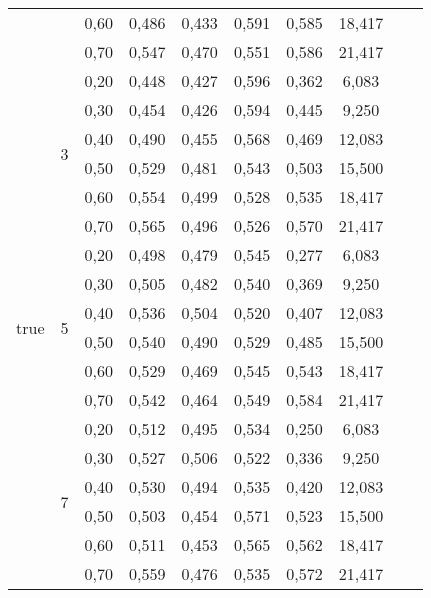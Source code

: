 \documentclass{article}
\begin{document}
\begin{longtable}[c]{|c|c|c|c|c|c|c|c|c|c|}
    &            & 0,60    &     0,486 &  0,433 & 0,591 & 0,585 & 18,417              \\ \cline{3-8}
    &            & 0,70    &     0,547 &  0,470 & 0,551 & 0,586 & 21,417              \\ \hline 
 \multirow{18}{*}{true} & \multirow{6}{*}{3} 
                 & 0,20    &     0,448 &  0,427 & 0,596 & 0,362 & 6,083               \\ \cline{3-8} 
    &            & 0,30    &     0,454 &  0,426 & 0,594 & 0,445 & 9,250               \\ \cline{3-8} 
    &            & 0,40    &     0,490 &  0,455 & 0,568 & 0,469 & 12,083              \\ \cline{3-8} 
    &            & 0,50    &     0,529 &  0,481 & 0,543 & 0,503 & 15,500              \\ \cline{3-8} 
    &            & 0,60    &     0,554 &  0,499 & 0,528 & 0,535 & 18,417              \\ \cline{3-8} 
    &            & 0,70    &     0,565 &  0,496 & 0,526 & 0,570 & 21,417              \\ \cline{2-8}
	   & \multirow{6}{*}{5} 
                 & 0,20    &     0,498 &  0,479 & 0,545 & 0,277 & 6,083               \\ \cline{3-8} 
    &            & 0,30    &     0,505 &  0,482 & 0,540 & 0,369 & 9,250               \\ \cline{3-8} 
    &            & 0,40    &     0,536 &  0,504 & 0,520 & 0,407 & 12,083              \\ \cline{3-8} 
    &            & 0,50    &     0,540 &  0,490 & 0,529 & 0,485 & 15,500              \\ \cline{3-8} 
    &            & 0,60    &     0,529 &  0,469 & 0,545 & 0,543 & 18,417              \\ \cline{3-8} 
    &            & 0,70    &     0,542 &  0,464 & 0,549 & 0,584 & 21,417              \\ \cline{2-8}
	   & \multirow{6}{*}{7} 
                 & 0,20    &     0,512 &  0,495 & 0,534 & 0,250 & 6,083               \\ \cline{3-8} 
    &            & 0,30    &     0,527 &  0,506 & 0,522 & 0,336 & 9,250               \\ \cline{3-8} 
    &            & 0,40    &     0,530 &  0,494 & 0,535 & 0,420 & 12,083              \\ \cline{3-8} 
    &            & 0,50    &     0,503 &  0,454 & 0,571 & 0,523 & 15,500              \\ \cline{3-8} 
    &            & 0,60    &     0,511 &  0,453 & 0,565 & 0,562 & 18,417              \\ \cline{3-8} 
    &            & 0,70    &     0,559 &  0,476 & 0,535 & 0,572 & 21,417              \\ \hline 
 \end{longtable}                                                         
\end{document}
